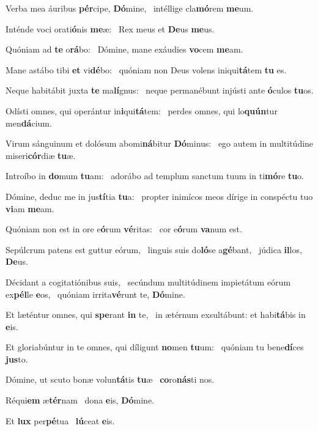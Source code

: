 \item Verba mea áuribus \textbf{pér}cipe, \textbf{Dó}mine,~\psstar{} intéllige cla\textbf{mó}rem \textbf{me}um.
\item Inténde voci orati\textbf{ó}nis \textbf{me}æ:~\psstar{} Rex meus et \textbf{De}us \textbf{me}us.
\item Quóniam ad \textbf{te} o\textbf{rá}bo:~\psstar{} Dómine, mane exáudies \textbf{vo}cem \textbf{me}am.
\item Mane astábo tibi \textbf{et} vi\textbf{dé}bo:~\psstar{} quóniam non Deus volens iniqui\textbf{tá}tem \textbf{tu} es.
\item Neque habitábit juxta \textbf{te} ma\textbf{lí}gnus:~\psstar{} neque permanébunt injústi ante \textbf{ó}culos \textbf{tu}os.
\item Odísti omnes, qui operántur in\textbf{i}qui\textbf{tá}tem:~\psstar{} perdes omnes, qui lo\textbf{quún}tur men\textbf{dá}cium.
\item Virum sánguinum et dolósum abomi\textbf{ná}bitur \textbf{Dó}minus:~\psstar{} ego autem in multitúdine miseri\textbf{cór}diæ \textbf{tu}æ.
\item Introíbo in \textbf{do}mum \textbf{tu}am:~\psstar{} adorábo ad templum sanctum tuum in ti\textbf{mó}re \textbf{tu}o.
\item Dómine, deduc me in jus\textbf{tí}tia \textbf{tu}a:~\psstar{} propter inimícos meos dírige in conspéctu tuo \textbf{vi}am \textbf{me}am.
\item Quóniam non est in ore e\textbf{ó}rum \textbf{vé}ritas:~\psstar{} cor e\textbf{ó}rum \textbf{va}num est.
\item Sepúlcrum patens est guttur eórum,~\pscross{} linguis suis do\textbf{ló}se a\textbf{gé}bant,~\psstar{} júdica \textbf{il}los, \textbf{De}us.
\item Décidant a cogitatiónibus suis,~\pscross{} secúndum multitúdinem impietátum eórum ex\textbf{pél}le \textbf{e}os,~\psstar{} quóniam irrita\textbf{vé}runt te, \textbf{Dó}mine.
\item Et læténtur omnes, qui \textbf{spe}rant \textbf{in} te,~\psstar{} in ætérnum exsultábunt: et habi\textbf{tá}bis in \textbf{e}is.
\item Et gloriabúntur in te omnes, qui díligunt \textbf{no}men \textbf{tu}um:~\psstar{} quóniam tu bene\textbf{dí}ces \textbf{jus}to.
\item Dómine, ut scuto bonæ volun\textbf{tá}tis \textbf{tu}æ~\psstar{} \textbf{co}ro\textbf{nás}ti nos.
\item Réqui\textbf{em} æ\textbf{tér}nam~\psstar{} dona \textbf{e}is, \textbf{Dó}mine.
\item Et \textbf{lux} per\textbf{pé}tua~\psstar{} \textbf{lú}ceat \textbf{e}is.